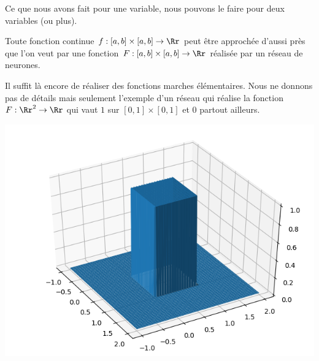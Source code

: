 \documentclass[11pt,class=report,crop=false]{standalone}
\begin{document}
Ce que nous avons fait pour une variable, nous pouvons le faire pour deux variables (ou plus).

\begin{theoreme}
Toute fonction continue $f : [a,b]\times [a,b] \to \Rr$ peut être approchée d'aussi près que l'on veut par une fonction $F : [a,b]\times [a,b] \to \Rr$ réalisée par un réseau de neurones.
\end{theoreme}

Il suffit là encore de réaliser des fonctions marches élémentaires. Nous ne donnons pas de détails mais seulement l'exemple d'un réseau qui réalise la fonction
$F : \Rr^2 \to \Rr$ qui vaut $1$ sur $[0,1]\times [0,1]$ et $0$ partout ailleurs.





\begin{center}
\begin{minipage}{0.45\textwidth}
\end{minipage}
\begin{minipage}{0.45\textwidth}
\includegraphics[scale=\myscale,scale=0.5]{figures/neurones-surface-1}
\end{minipage}
\end{center}
\end{document}
